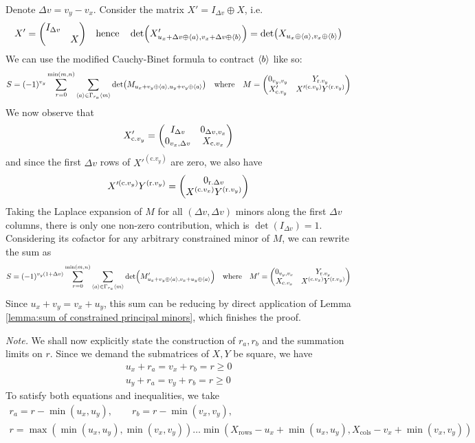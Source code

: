 	Denote $\Delta v = v_y-v_x$. Consider the matrix $X'=I_{\Delta v}\oplus X$, i.e.
	\begin{equation}
	X'=\mqty(\dmat{I_{\Delta v}, X})\qq{hence}\det(X'_{u_x+\Delta v\oplus\seq{a},v_x+\Delta v\oplus\seq{b}})=\det(X_{u_x\oplus\seq{a},v_x\oplus\seq{b}})
	\end{equation}
	We can use the modified Cauchy-Binet formula to contract $\langle b\rangle$ like so:
	\begin{align}
	S=(-1)^{v_y}\sum_{r=0}^{\min(m,n)}\sum_{\seq{a}\in\Gamma_{r_a}\seq{m}}\det(M_{u_x+v_y\oplus\seq{a}, u_y+v_y\oplus\seq{a}})\qq{where}M=\mqty(
		0_{v_y,v_y} & Y_{\text{r.} v_y}\\
		X'_{\text{c.} v_y} & X'^{(\text{c.} v_y)} Y^{(\text{r.} v_y)}
	)
	\end{align}
	We now observe that
	\begin{equation}
	X'_{\text{c.} v_y} = \mqty(
		I_{\Delta v} & 0_{\Delta v, v_x}\\
		0_{v_x, \Delta v} & X_{\text{c.} v_x}
	)
	\end{equation}
	and since the first $\Delta v$ rows of $X'^{(\text{c.} v_y)}$ are zero, we also have
	\begin{equation}
	X'^{(\text{c.} v_y)} Y^{(\text{r.} v_y)} = \mqty(0_{\text{r.} \Delta v} \\ X^{(\text{c.} v_x)} Y^{(\text{r.} v_y)})
	\end{equation}
	Taking the Laplace expansion of $M$ for all $(\Delta v,\Delta v)$ minors along the first $\Delta v$ columns, there is only one non-zero contribution, which is $\det(I_{\Delta v})=1$. Considering its cofactor for any arbitrary constrained minor of $M$, we can rewrite the sum as
	\begin{equation}
	S = (-1)^{v_y(1+\Delta v)}\sum_{r=0}^{\min(m,n)}\sum_{\seq{a}\in\Gamma_{r_a}\seq{m}}\det(M'_{u_x+v_y\oplus\seq{a},v_x+u_y\oplus\seq{a}})\qq{where}M'=\mqty(
		0_{v_y,v_x} & Y_{\text{r.} v_y}\\
		X_{\text{c.} v_x} & X^{(\text{c.} v_x)}Y^{(\text{r.} v_y)}
	)
	\end{equation}
	Since $u_x+v_y=v_x+u_y$, this sum can be reducing by direct application of Lemma \ref{lemma:sum of constrained principal minors}, which finishes the proof.
	
	\textit{Note.} We shall now explicitly state the construction of $r_a, r_b$ and the summation limits on $r$. Since we demand the submatrices of $X, Y$ be square, we have
	\begin{eqnarray}
	u_x + r_a = v_x + r_b = r \geq 0\\
	u_y + r_a = v_y + r_b = r \geq 0
	\end{eqnarray}
	To satisfy both equations and inequalities, we take
	\begin{multline}
	r_a=r - \min(u_x,u_y),\qquad r_b=r - \min(v_x,v_y),\\
	r = \max(\min(u_x, u_y), \min(v_x, v_y))\dots \min(X_{\text{rows}}-u_x+\min(u_x, u_y),X_{\text{cols}}-v_x+\min(v_x, v_y))
	\end{multline}